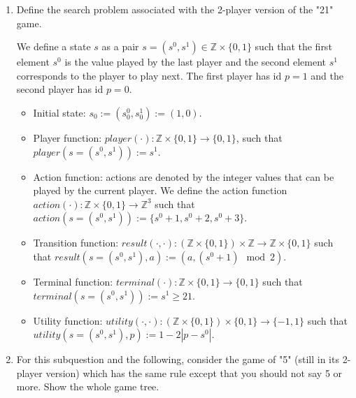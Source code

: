 \documentclass[9pt,a4paper]{extarticle}
\newenvironment{solution}
    {%
    \color{red}
    }
    { 
    \color{black}
    }
\begin{document}
\begin{enumerate}
    \item Define the search problem associated with the 2-player version of the "21" game.

    \begin{solution}
        We define a state $s$ as a pair $s = (s^0, s^1) \in \mathbb{Z}\times \{0, 1\}$ such that the first element $s^0$ is the value played by the last player and the second element $s^1$ corresponds to the player to play next. The first player has id $p=1$ and the second player has id $p=0$.
        \begin{itemize}
            \item Initial state: $s_0 := (s_0^0, s_0^1) := (1, 0)$.
            \item Player function: $player(\cdot): \mathbb{Z}\times \{0, 1\} \rightarrow \{0, 1\}$, such that
            $player(s= (s^0, s^1)) := s^1$.
            \item Action function: actions are denoted by the integer values that can be played by the current player. We define the action function $action(\cdot): \mathbb{Z}\times \{0, 1\}\rightarrow \mathbb{Z}^3$ such that $action(s= (s^0, s^1)) := \{s^0 + 1, s^0 + 2, s^0 + 3\} $.
            \item Transition function: $result(\cdot, \cdot): (\mathbb{Z}\times \{0, 1\})\times \mathbb{Z} \rightarrow \mathbb{Z}\times \{0, 1\}$ such that $result(s=(s^0, s^1), a) := (a, (s^0 + 1)\mod 2)$.
            \item Terminal function: $terminal(\cdot): \mathbb{Z}\times \{0, 1\} \rightarrow \{0, 1\}$ such that $terminal(s=(s^0, s^1)) := s^1 \geq 21$.
            \item Utility function: $utility(\cdot, \cdot): (\mathbb{Z}\times \{0, 1\}) \times \{0, 1\} \rightarrow \{-1, 1\}$ such that $utility(s=(s^0, s^1), p) := 1 - 2|p - s^0|$.
        \end{itemize}
    \end{solution}
    
    \item For this subquestion and the following, consider the game of "5" (still in its 2-player version) which has the same rule except that you should not say 5 or more. Show the whole game tree.
    

\end{enumerate}
\end{document}
